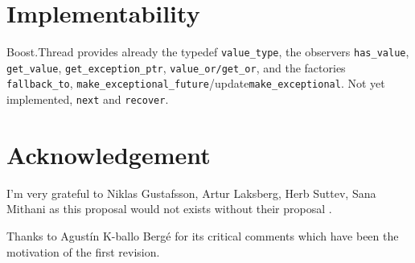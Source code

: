 \documentclass[a4paper,10pt]{article}
\newcommand{\cpp}[1]{\lstinline{#1}}
\newcommand{\suppress}[1]{\colorbox{suppress_color}{#1}}
\newcommand{\update}[1]{\colorbox{update_color}{#1}}
\begin{document}
\section{Implementability}

Boost.Thread \cite{BOOST_THREAD} provides already the typedef \cpp{value_type}, the observers \cpp{has_value}, \suppress{\cpp{get_value},} \cpp{get_exception_ptr}, \cpp{value_or/get_or}, and the factories \cpp{fallback_to}, \suppress{\cpp{make_exceptional_future}}/update{\cpp{make_exceptional}}. Not yet implemented, \cpp{next} and \cpp{recover}.

\section{Acknowledgement}

I'm very grateful to Niklas Gustafsson, Artur Laksberg, Herb Suttev, Sana Mithani as this proposal would not exists without their proposal  \cite{N3784}.

\update{
Thanks to Agust\'{i}n K-ballo Berg\'{e} for its critical comments which have been the motivation of the first revision.
}
\newpage


\end{document}

